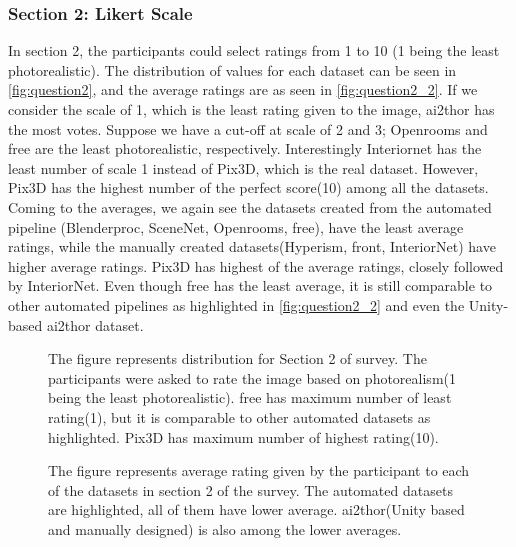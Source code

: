\subsubsection{Section 2: Likert Scale}
In section 2, the participants could select ratings from 1 to 10 (1 being the least photorealistic).
The distribution of values for each dataset can be seen in \autoref{fig:question2}, and the average ratings are as seen in \autoref{fig:question2_2}.
If we consider the scale of 1, which is the least rating given to the image, \gls{ai2thor} has the most votes.
Suppose we have a cut-off at scale of 2 and 3; Openrooms and \gls{free} are the least photorealistic, respectively.
Interestingly Interiornet has the least number of scale 1 instead of Pix3D, which is the real dataset.
However, Pix3D has the highest number of the perfect score(10) among all the datasets.
Coming to the averages, we again see the datasets created from the automated pipeline (Blenderproc, SceneNet, Openrooms, \gls{free}), have the least average ratings,
while the manually created datasets(Hyperism, \gls{front}, InteriorNet) have higher average ratings.
Pix3D has highest of the average ratings, closely followed by InteriorNet.
Even though \gls{free} has the least average, it is still comparable to other automated pipelines as highlighted in \autoref{fig:question2_2} and even the Unity-based \gls{ai2thor} dataset.

\begin{figure}
    \centering
    \resizebox{\textwidth}{!}{}
    \caption{The figure represents distribution for Section 2 of survey. The participants were asked to rate the image based on photorealism(1 being the least photorealistic).
    \gls{free} has maximum number of least rating(1), but it is comparable to other automated datasets as highlighted. Pix3D has maximum number of highest rating(10).}
    \label{fig:question2}
\end{figure}

\begin{figure}
    \centering
    \resizebox{0.75\textwidth}{10cm}{}
    \caption{The figure represents average rating given by the participant to each of the datasets in section 2 of the survey.
    The automated datasets are highlighted, all of them have lower average. \gls{ai2thor}(Unity based and manually designed) is also among the lower averages.}
    \label{fig:question2_2}
\end{figure}

